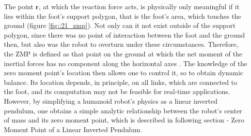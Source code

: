 The point $\bm{r}$, at which the reaction force acts, is physically only meaningful if it lies within the foot's support polygon, that is the foot's area, which touches the ground (figure \ref{fig::21_zmp}). Not only can it not exist outside of the support polygon, since there was no point of interaction between the foot and the ground then, but also was the robot to overturn under these circumstances. Therefore, the ZMP is defined as that point on the ground at which the net moment of the inertial forces has no component along the horizontal axes \cite{hirai1998development}\cite{dasgupta1999making}. The knowledge of the zero moment point's location then allows one to control it, so to obtain dynamic balance. Its location depends, in principle, on all links, which are connected to the foot, and its computation may not be feasible for real-time applications. However, by simplifying a humanoid robot's physics as a linear inverted pendulum, one obtains a simple analytic relationship between the robot's center of mass and its zero moment point, which is described in following section - Zero Moment Point of a Linear Inverted Pendulum.
\FloatBarrier
